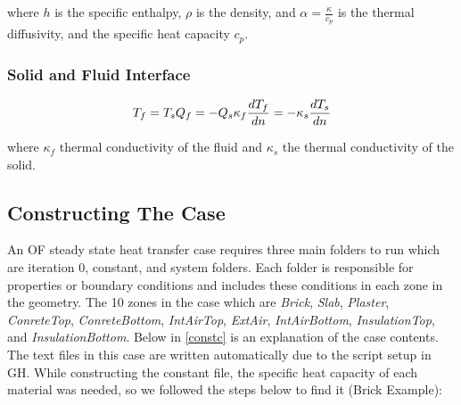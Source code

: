 where \( h \) is the specific enthalpy, \( \rho \) is the density, and \( \alpha = \frac{\kappa}{c_p} \) is the thermal diffusivity, and the specific heat capacity \( c_p \). 


\subsubsection{Solid and Fluid Interface}
\begin{equation}
T_f = T_s  \\
Q_f = -Q_s  \\
\kappa_f \frac{d T_f}{d n} = -\kappa_s \frac{d T_s}{d n} 
\end{equation}

where \( \kappa_f \) thermal conductivity of the fluid and \( \kappa_s \)  the thermal conductivity of the solid.


\subsection{Constructing The Case}    
An OF steady state heat transfer case requires three main folders to run which are iteration 0, constant, and system folders. Each folder is responsible for properties or boundary conditions and includes these conditions in each zone in the geometry. The 10 zones in the case which are \textit{Brick}, \textit{Slab}, \textit{Plaster}, \textit{ConreteTop}, \textit{ConreteBottom}, \textit{IntAirTop}, \textit{ExtAir}, \textit{IntAirBottom}, \textit{InsulationTop}, and \textit{InsulationBottom}. Below in \cref{constc} is an explanation of the case contents. The text files in this case are written automatically due to the script setup in GH. While constructing the constant file, the specific heat capacity of each material was needed, so we followed the steps below to find it (Brick Example):

